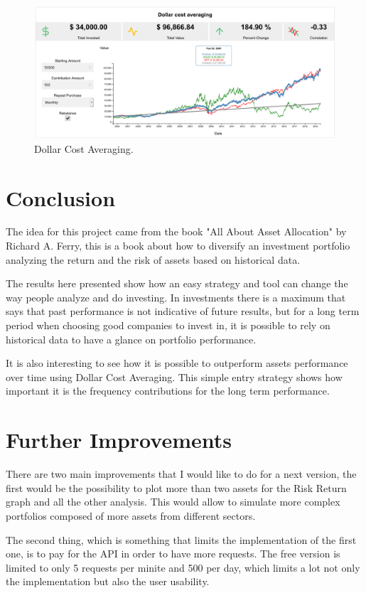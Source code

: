 \documentclass{article}
\begin{document}
\begin{figure}
  \includegraphics[scale=0.25]{images/dca.png}
  \centering
  \caption{Dollar Cost Averaging.}
  \label{fig:dca}
\end{figure}

\section{Conclusion}

The idea for this project came from the book "All About Asset Allocation" by Richard A. Ferry, this is a book about how to diversify an investment portfolio analyzing the return and the risk of assets based on historical data.

The results here presented show how an easy strategy and tool can change the way people analyze and do investing. In investments there is a maximum that says that past performance is not indicative of future results, but for a long term period when choosing good companies to invest in, it is possible to rely on historical data to have a glance on portfolio performance.

It is also interesting to see how it is possible to outperform assets performance over time using Dollar Cost Averaging. This simple entry strategy shows how important it is the frequency contributions for the long term performance.

\section{Further Improvements}

There are two main improvements that I would like to do for a next version, the first would be the possibility to plot more than two assets for the Risk Return graph and all the other analysis. This would allow to simulate more complex portfolios composed of more assets from different sectors.

The second thing, which is something that limits the implementation of the first one, is to pay for the API in order to have more requests. The free version is limited to only 5 requests per minite and 500 per day, which limits a lot not only the implementation but also the user usability.




\clearpage



\end{document}
